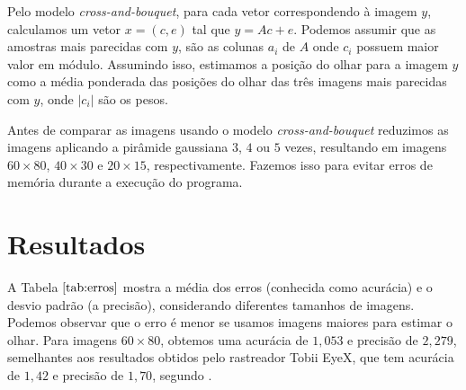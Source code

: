 Pelo modelo \textit{cross-and-bouquet}, para cada vetor correspondendo à imagem $y$, calculamos um vetor $x = (c, e)$ tal que $y = Ac + e$. Podemos assumir que as amostras mais parecidas com $y$, são as colunas $a_i$ de $A$ onde $c_i$ possuem maior valor em módulo. Assumindo isso, estimamos a posição do olhar para a imagem $y$ como a média ponderada das posições do olhar das três imagens mais parecidas com $y$, onde $\vert c_i \vert$ são os pesos.

Antes de comparar as imagens usando o modelo \textit{cross-and-bouquet} reduzimos as imagens aplicando a pirâmide gaussiana $3$, $4$ ou $5$ vezes, resultando em imagens $60 \times 80$, $40 \times 30$ e $20 \times 15$, respectivamente. Fazemos isso para evitar erros de memória durante a execução do programa.


\section{Resultados}
A Tabela $\ref{tab:erros}$ mostra a média dos erros (conhecida como acurácia) e o desvio padrão (a precisão), considerando  diferentes tamanhos de imagens. Podemos observar que o erro é menor se usamos imagens maiores para estimar o olhar. Para imagens $60 \times 80$, obtemos uma acurácia de $1,053 $ e precisão de $2,279$, semelhantes aos resultados obtidos pelo rastreador Tobii EyeX, que tem acurácia de $1,42$ e precisão de $1,70$, segundo \cite{liboku}. 

